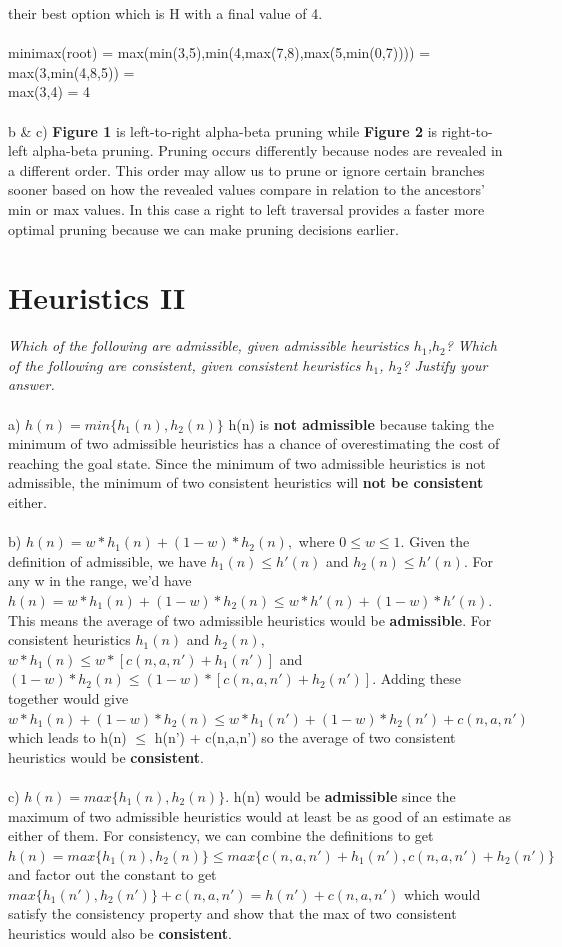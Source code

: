 \documentclass{article}
\begin{document}
their best option which is H with a final value of 4.
\\\\
minimax(root) = max(min(3,5),min(4,max(7,8),max(5,min(0,7)))) =\\ max(3,min(4,8,5)) = \\
max(3,4) = 4
\\\\
b \& c) \textbf{Figure 1} is left-to-right alpha-beta pruning while \textbf{Figure 2} is right-to-left alpha-beta pruning. Pruning occurs differently because nodes are revealed in a different order. This order may allow us to prune or ignore certain branches sooner based on how the revealed values compare in relation to the ancestors’ min or max values. In this case a right to left traversal provides a faster more optimal pruning because we can make pruning decisions earlier.
\newpage
\section{Heuristics II}
\textit{Which of the following are admissible, given admissible heuristics $h_1$,$h_2$? Which of the following are consistent, given consistent heuristics $h_1$, $h_2$? Justify your answer.}\\\\
a) $h(n) = min\{h_1(n), h_2(n)\}$ h(n) is \textbf{not admissible} because taking the minimum of two admissible heuristics has a chance of overestimating the cost of reaching the goal state. Since the minimum of two admissible heuristics is not admissible, the minimum of two consistent heuristics will \textbf{not be consistent} either.
\\\\
b) $h(n) = w*h_1(n) + (1-w)*h_2(n),$ where $0 \leq w \leq 1$. Given the definition of admissible, we have $h_1(n) \leq h'(n)$ and $h_2(n) \leq h'(n)$. For any w in the range, we'd have $h(n) = w*h_1(n) + (1-w)*h_2(n) \leq w*h'(n) + (1-w)*h'(n).$ This means the average of two admissible heuristics would be \textbf{admissible}. For consistent heuristics $h_1(n)$ and $h_2(n)$, $w*h_1(n) \leq w*[c(n,a,n') + h_1(n')]$ and $(1-w)*h_2(n) \leq (1-w)*[c(n,a,n') + h_2(n')]$. Adding these together would give $w*h_1(n) + (1-w)*h_2(n) \leq w*h_1(n') + (1-w)*h_2(n') + c(n,a,n')$ which leads to h(n) $\leq$ h(n') + c(n,a,n') so the average of two consistent heuristics would be \textbf{consistent}.
\\\\
c) $h(n) = max\{h_1(n), h_2(n)\}$. h(n) would be \textbf{admissible} since the maximum of two admissible heuristics would at least be as good of an estimate as either of them. For consistency, we can combine the definitions to get $h(n) = max\{h_1(n), h_2(n)\} \leq max\{c(n,a,n')+h_1(n'),c(n,a,n')+h_2(n')\}$ and factor out the constant to get $max\{h_1(n'),h_2(n')\} + c(n,a,n') = h(n') + c(n,a,n')$ which would satisfy the consistency property and show that the max of two consistent heuristics would also be \textbf{consistent}.
\newpage
\end{document}
